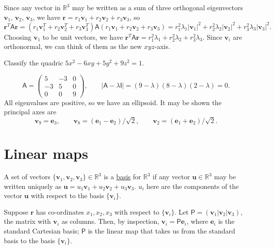 \documentclass[10pt,notitlepage]{revtex4-1}
\newenvironment{example}[1][Example]{\begin{trivlist}
\item[\hskip \labelsep {\bfseries #1}]}{\end{trivlist}}
\newcommand{\eb}{\boldsymbol{e}}
\newcommand{\ub}{\boldsymbol{u}}
\newcommand{\vb}{\boldsymbol{v}}
\begin{document}
Since any vector in $\mathbb{R}^3$ may be written as a sum of three orthogonal
eigenvectors $\vb_1$, $\vb_2$, $\vb_3$, we have $\boldsymbol{r}=r_1 \vb_1 + r_2
\vb_2 + r_3 \vb_3$, so
\begin{equation}
	\boldsymbol{r}^T \mathsf{A}\boldsymbol{r}=
	(r_1 \vb_1^T + r_2\vb_2^T + r_3 \vb_3^T)\mathsf{A}(r_1 \vb_1 + r_2 \vb_2 +
	r_3 \vb_3)=r_1^2 \lambda_1|\vb_1|^2 + r_2^2 \lambda_2|\vb_2|^2 +
	r_3^2 \lambda_3|\vb_3|^2.
\end{equation}
Choosing $\vb_1$ to be unit vectors, we have $\boldsymbol{r}^T
\mathsf{A}\boldsymbol{r}=r_1^2 \lambda_1 + r_2^2 \lambda_2 + r_3^2 \lambda_3$.
Since $\vb_i$ are orthonormal, we can think of them as the new $xyz$-axis.
\begin{example}
	Classify the quadric $5x^2-6xy+5y^2+9z^2=1$.
	
	\begin{equation}
		\mathsf{A}=\begin{pmatrix}5&-3&0\\-3&5&0\\0&0&9\end{pmatrix},\qquad
		|\mathsf{A}-\lambda\mathsf{I}|=(9-\lambda)(8-\lambda)(2-\lambda)=0.
	\end{equation}
	All eigenvalues are positive, so we have an ellipsoid. It may be shown the
	principal axes are
	\begin{equation}
		\vb_9 = \eb_3,\qquad \vb_8=(\eb_1-\eb_2)/\sqrt{2},\qquad
		\vb_2=(\eb_1+\eb_2)/\sqrt{2}.
	\end{equation}
\end{example}


\section{Linear maps}

A set of vectors $\{\vb_1,\vb_2,\vb_3\}\in\mathbb{R}^3$ is a \underline{basis}
for $\mathbb{R}^3$ if any vector $\ub\in\mathbb{R}^3$ may be written uniquely as
$\ub=u_1 \vb_1 + u_2 \vb_2 + u_3 \vb_3$. $u_i$ here are the components of the
vector $\ub$ with respect to the basis $\{\vb_i\}$.

Suppose $\boldsymbol{r}$ has co-ordinates $x_1, x_2, x_3$ with respect to
$\{\vb_i\}$. Let $\mathsf{P}=(\vb_1|\vb_2|\vb_3)$, the matrix with $\vb_i$ as
columns. Then, by inspection, $\vb_i=\mathsf{P}\eb_i$, where $\eb_i$ is the
standard Cartesian basis; $\mathsf{P}$ is the linear map that takes us from the
standard basis to the basis $\{\vb_i\}$.
\end{document}
